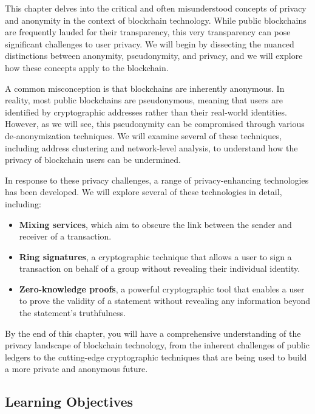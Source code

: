 This chapter delves into the critical and often misunderstood concepts
of privacy and anonymity in the context of blockchain technology. While
public blockchains are frequently lauded for their transparency, this
very transparency can pose significant challenges to user privacy. We
will begin by dissecting the nuanced distinctions between anonymity,
pseudonymity, and privacy, and we will explore how these concepts apply
to the blockchain.

A common misconception is that blockchains are inherently anonymous. In
reality, most public blockchains are pseudonymous, meaning that users
are identified by cryptographic addresses rather than their real-world
identities. However, as we will see, this pseudonymity can be
compromised through various de-anonymization techniques. We will examine
several of these techniques, including address clustering and
network-level analysis, to understand how the privacy of blockchain
users can be undermined.

In response to these privacy challenges, a range of privacy-enhancing
technologies has been developed. We will explore several of these
technologies in detail, including:

\begin{itemize}
\tightlist
\item
  \textbf{Mixing services}, which aim to obscure the link between the
  sender and receiver of a transaction.
\item
  \textbf{Ring signatures}, a cryptographic technique that allows a user
  to sign a transaction on behalf of a group without revealing their
  individual identity.
\item
  \textbf{Zero-knowledge proofs}, a powerful cryptographic tool that
  enables a user to prove the validity of a statement without revealing
  any information beyond the statement's truthfulness.
\end{itemize}

By the end of this chapter, you will have a comprehensive understanding
of the privacy landscape of blockchain technology, from the inherent
challenges of public ledgers to the cutting-edge cryptographic
techniques that are being used to build a more private and anonymous
future.

\subsection{Learning Objectives}\label{learning-objectives}

